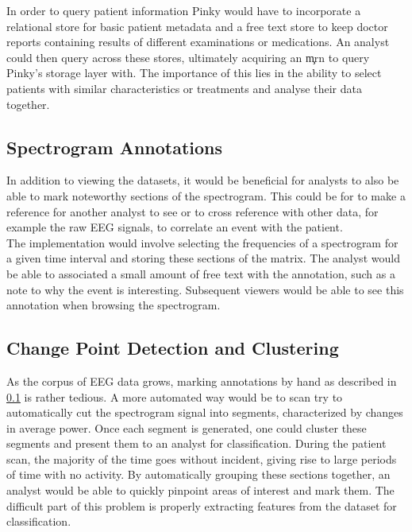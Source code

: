 In order to query patient information Pinky would have to incorporate a
relational store for basic patient metadata and a free text store to keep
doctor reports containing results of different examinations or medications. An
analyst could then query across these stores, ultimately acquiring an \c{mrn}
to query Pinky's storage layer with. The importance of this lies in the ability
to select patients with similar characteristics or treatments and analyse their
data together.

\subsection{Spectrogram Annotations}\label{discuss-ch:annotations}

In addition to viewing the datasets, it would be beneficial for analysts to
also be able to mark noteworthy sections of the spectrogram. This could be for
to make a reference for another analyst to see or to cross reference with other
data, for example the raw EEG signals, to correlate an event with the patient. \\

The implementation would involve selecting the frequencies of a spectrogram for
a given time interval and storing these sections of the matrix.  The analyst
would be able to associated a small amount of free text with the annotation,
such as a note to why the event is interesting. Subsequent viewers would be
able to see this annotation when browsing the spectrogram.

\subsection{Change Point Detection and Clustering}\label{discuss-ch:cpd}

As the corpus of EEG data grows, marking annotations by hand as described in
\ref{discuss-ch:annotations} is rather tedious.  A more automated way would be to scan
try to automatically cut the spectrogram signal into segments, characterized by
changes in average power. Once each segment is generated, one could cluster
these segments and present them to an analyst for classification. During the
patient scan, the majority of the time goes without incident, giving rise to
large periods of time with no activity. By automatically grouping these
sections together, an analyst would be able to quickly pinpoint areas of
interest and mark them. The difficult part of this problem is properly
extracting features from the dataset for classification. \\


